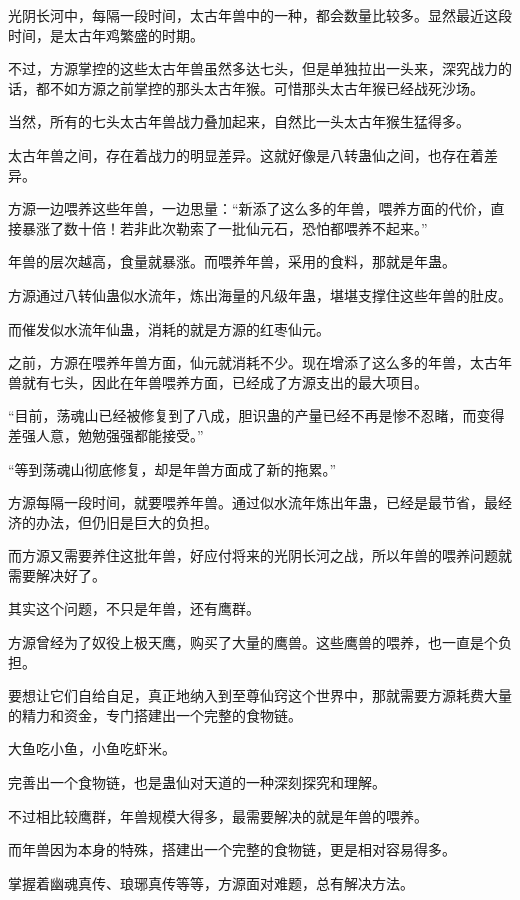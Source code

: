 \begin{this_body}
光阴长河中，每隔一段时间，太古年兽中的一种，都会数量比较多。显然最近这段时间，是太古年鸡繁盛的时期。

不过，方源掌控的这些太古年兽虽然多达七头，但是单独拉出一头来，深究战力的话，都不如方源之前掌控的那头太古年猴。可惜那头太古年猴已经战死沙场。

当然，所有的七头太古年兽战力叠加起来，自然比一头太古年猴生猛得多。

太古年兽之间，存在着战力的明显差异。这就好像是八转蛊仙之间，也存在着差异。

方源一边喂养这些年兽，一边思量：“新添了这么多的年兽，喂养方面的代价，直接暴涨了数十倍！若非此次勒索了一批仙元石，恐怕都喂养不起来。”

年兽的层次越高，食量就暴涨。而喂养年兽，采用的食料，那就是年蛊。

方源通过八转仙蛊似水流年，炼出海量的凡级年蛊，堪堪支撑住这些年兽的肚皮。

而催发似水流年仙蛊，消耗的就是方源的红枣仙元。

之前，方源在喂养年兽方面，仙元就消耗不少。现在增添了这么多的年兽，太古年兽就有七头，因此在年兽喂养方面，已经成了方源支出的最大项目。

“目前，荡魂山已经被修复到了八成，胆识蛊的产量已经不再是惨不忍睹，而变得差强人意，勉勉强强都能接受。”

“等到荡魂山彻底修复，却是年兽方面成了新的拖累。”

方源每隔一段时间，就要喂养年兽。通过似水流年炼出年蛊，已经是最节省，最经济的办法，但仍旧是巨大的负担。

而方源又需要养住这批年兽，好应付将来的光阴长河之战，所以年兽的喂养问题就需要解决好了。

其实这个问题，不只是年兽，还有鹰群。

方源曾经为了奴役上极天鹰，购买了大量的鹰兽。这些鹰兽的喂养，也一直是个负担。

要想让它们自给自足，真正地纳入到至尊仙窍这个世界中，那就需要方源耗费大量的精力和资金，专门搭建出一个完整的食物链。

大鱼吃小鱼，小鱼吃虾米。

完善出一个食物链，也是蛊仙对天道的一种深刻探究和理解。

不过相比较鹰群，年兽规模大得多，最需要解决的就是年兽的喂养。

而年兽因为本身的特殊，搭建出一个完整的食物链，更是相对容易得多。

掌握着幽魂真传、琅琊真传等等，方源面对难题，总有解决方法。


\end{this_body}
